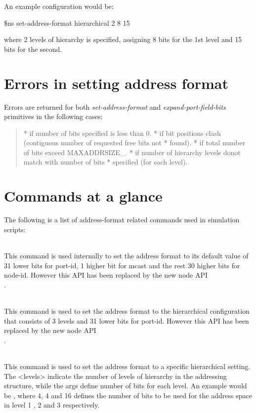 An example configuration would be:

\$ns set-address-format hierarchical 2 8 15 

where 2 levels of hierarchy is specified, assigning 8 bits for the 1st
level and 15 bits for the second.


\section{Errors in setting address format}
\label{sec:err-add}

Errors are returned for both {\em set-address-format} and
{\em expand-port-field-bits} primitives in the following cases:
\begin{quote}
* if number of bits specified is less than 0.
* if bit positions clash (contiguous number of requested free bits not
* found).  
* if total number of bits exceed MAXADDRSIZE\_.
* if number of hierarchy levels donot match with number of bits
* specified (for each level).  
\end{quote}

\section{Commands at a glance}
\label{sec:addresscommand}

The following is a list of address-format related commands used in simulation
scripts:
\begin{flushleft}
\\
This command is used internally to set the address format to its default value
of 31 lower bits for port-id, 1 higher bit for mcast and the rest 30 higher bits
for node-id. However this API has been replaced by the new node API\\
.


\\
This command is used to set the address format to the hierarchical configuration
that consists of 3 levels and 31 lower bits
for port-id. However this API has been replaced by the new node API\\
.


\\
This command is used to set the address format to a specific hierarchical
setting. The <levels> indicate the number of levels of hierarchy in the addressing
structure, while the args define number of bits for each level. An example
would be  , where 4, 4 and
16 defines the number of bits to be used for the address space in level 1 , 2
and 3 respectively.


\end{flushleft}
\endinput





